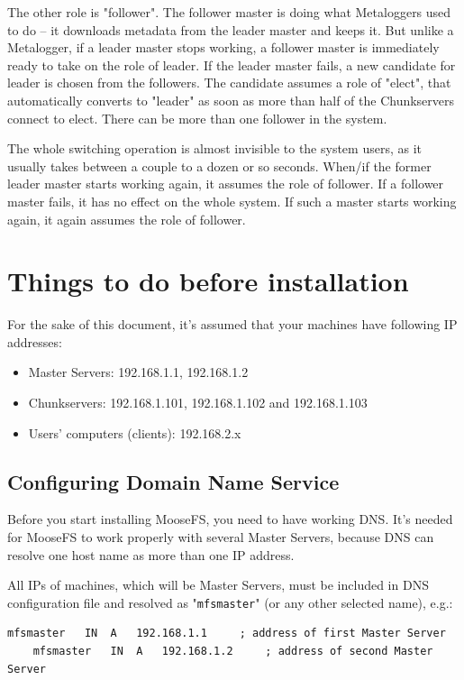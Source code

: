 \documentclass[a4paper,11pt,english]{report}
\def\code#1{\texttt{#1}}
\begin{document}
		The other role is "follower". The follower master is doing what Metaloggers used to do -- it
	downloads metadata from the leader master and keeps it. But unlike a Metalogger, if a leader master stops working, a follower master is immediately ready to take on the role of leader.
	If the leader master fails, a new candidate for leader is chosen from the followers. The candidate
	assumes a role of "elect", that automatically converts to "leader" as soon as more than half of the Chunkservers connect to elect. There can be more than one follower in the system.
	
		The whole switching operation is almost invisible to the system users, as it usually takes between a couple to a dozen or so seconds. When/if the former leader master starts working again, it assumes the role of follower. If a follower master fails, it has no effect on the whole system. If such a master starts working again, it again assumes the role of follower.
		
		
	\chapter{Things to do before installation}
		For the sake of this document, it's assumed that your machines have following IP addresses:
		\begin{itemize}
			\item Master Servers: 192.168.1.1, 192.168.1.2
			\item Chunkservers: 192.168.1.101, 192.168.1.102 and 192.168.1.103
			\item Users' computers (clients): 192.168.2.x
		\end{itemize}
		
		\section{Configuring Domain Name Service}
			Before you start installing MooseFS, you need to have working DNS. It's needed for MooseFS to work properly with several Master Servers, because DNS can resolve one host name as more than one IP address.
	
			All IPs of machines, which will be Master Servers, must be included in DNS configuration file and resolved as "\code{mfsmaster}" (or any other selected name), e.g.:
	
		\begin{lstlisting}[caption={DNS entries}]
	mfsmaster	IN	A	192.168.1.1		; address of first Master Server
	mfsmaster	IN	A	192.168.1.2		; address of second Master Server
		\end{lstlisting}
		
\end{document}
